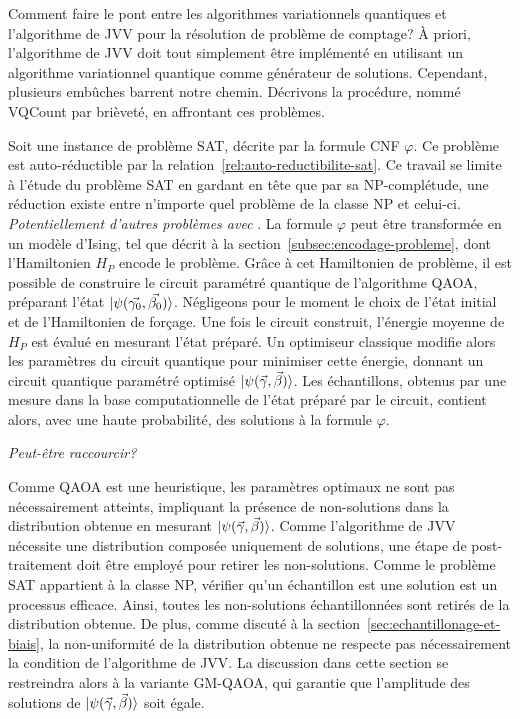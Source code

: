 Comment faire le pont entre les algorithmes variationnels quantiques et l'algorithme de JVV pour la résolution de problème de comptage? À priori, l'algorithme de JVV doit tout simplement être implémenté en utilisant un algorithme variationnel quantique comme générateur de solutions. Cependant, plusieurs embûches barrent notre chemin. Décrivons la procédure, nommé VQCount par brièveté, en affrontant ces problèmes.

Soit une instance de problème SAT, décrite par la formule CNF $\varphi$. Ce problème est auto-réductible par la relation~\ref{rel:auto-reductibilite-sat}. Ce travail se limite à l'étude du problème SAT en gardant en tête que par sa \textsf{NP}-complétude, une réduction existe entre n'importe quel problème de la classe \textsf{NP} et celui-ci. \textcolor{mydarkred}{\textit{Potentiellement d'autres problèmes avec }}. La formule $\varphi$ peut être transformée en un modèle d'Ising, tel que décrit à la section~\ref{subsec:encodage-probleme}, dont l'Hamiltonien $H_{P}$ encode le problème. Grâce à cet Hamiltonien de problème, il est possible de construire le circuit paramétré quantique de l'algorithme QAOA, préparant l'état $\ket{\psi(\vec{\gamma_{0}}, \vec{\beta_{0}})}$. Négligeons pour le moment le choix de l'état initial et de l'Hamiltonien de forçage. Une fois le circuit construit, l'énergie moyenne de $H_{P}$ est évalué en mesurant l'état préparé. Un optimiseur classique modifie alors les paramètres du circuit quantique pour minimiser cette énergie, donnant un circuit quantique paramétré optimisé $\ket{\psi(\vec{\gamma}, \vec{\beta})}$.
Les échantillons, obtenus par une mesure dans la base computationnelle de l'état préparé par le circuit, contient alors, avec une haute probabilité, des solutions à la formule $\varphi$.

\textcolor{mydarkred}{\textit{Peut-être raccourcir?}}

Comme QAOA est une heuristique, les paramètres optimaux ne sont pas nécessairement atteints, impliquant la présence de non-solutions dans la distribution obtenue en mesurant $\ket{\psi(\vec{\gamma}, \vec{\beta})}$. Comme l'algorithme de JVV nécessite une distribution composée uniquement de solutions, une étape de post-traitement doit être employé pour retirer les non-solutions. Comme le problème SAT appartient à la classe \textsf{NP}, vérifier qu'un échantillon est une solution est un processus efficace. Ainsi, toutes les non-solutions échantillonnées sont retirés de la distribution obtenue. De plus, comme discuté à la section~\ref{sec:echantillonage-et-biais}, la non-uniformité de la distribution obtenue ne respecte pas nécessairement la condition de l'algorithme de JVV. La discussion dans cette section se restreindra alors à la variante GM-QAOA, qui garantie que l'amplitude des solutions de $\ket{\psi(\vec{\gamma}, \vec{\beta})}$ soit égale. 

